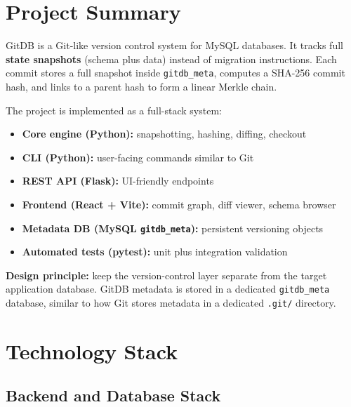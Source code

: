 \documentclass[12pt, a4paper]{article}
\begin{document}
\tableofcontents
\newpage

\section{Project Summary}

GitDB is a Git-like version control system for MySQL databases. It tracks full
\textbf{state snapshots} (schema plus data) instead of migration instructions.
Each commit stores a full snapshot inside \texttt{gitdb\_meta}, computes a
SHA-256 commit hash, and links to a parent hash to form a linear Merkle chain.

The project is implemented as a full-stack system:
\begin{itemize}[leftmargin=1.5em]
    \item \textbf{Core engine (Python):} snapshotting, hashing, diffing, checkout
    \item \textbf{CLI (Python):} user-facing commands similar to Git
    \item \textbf{REST API (Flask):} UI-friendly endpoints
    \item \textbf{Frontend (React + Vite):} commit graph, diff viewer, schema browser
    \item \textbf{Metadata DB (MySQL \texttt{gitdb\_meta}):} persistent versioning objects
    \item \textbf{Automated tests (pytest):} unit plus integration validation
\end{itemize}

\begin{tcolorbox}[infobox]
\textbf{Design principle:} keep the version-control layer separate from the target
application database. GitDB metadata is stored in a dedicated \texttt{gitdb\_meta}
database, similar to how Git stores metadata in a dedicated \texttt{.git/} directory.
\end{tcolorbox}

\section{Technology Stack}

\subsection{Backend and Database Stack}
\end{document}
